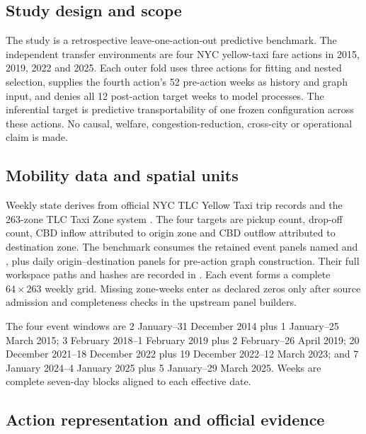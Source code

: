\documentclass{nature}
\begin{document}
\begin{methods}

\subsection{Study design and scope}

The study is a retrospective leave-one-action-out predictive benchmark. The independent transfer environments are four NYC yellow-taxi fare actions in 2015, 2019, 2022 and 2025. Each outer fold uses three actions for fitting and nested selection, supplies the fourth action's 52 pre-action weeks as history and graph input, and denies all 12 post-action target weeks to model processes. The inferential target is predictive transportability of one frozen configuration across these actions. No causal, welfare, congestion-reduction, cross-city or operational claim is made.

\subsection{Mobility data and spatial units}

Weekly state derives from official NYC TLC Yellow Taxi trip records and the 263-zone TLC Taxi Zone system \cite{tlctripdata}. The four targets are pickup count, drop-off count, CBD inflow attributed to origin zone and CBD outflow attributed to destination zone. The benchmark consumes the retained event panels named  and , plus daily origin--destination panels for pre-action graph construction. Their full workspace paths and hashes are recorded in . Each event forms a complete $64\times263$ weekly grid. Missing zone-weeks enter as declared zeros only after source admission and completeness checks in the upstream panel builders.

The four event windows are 2 January--31 December 2014 plus 1 January--25 March 2015; 3 February 2018--1 February 2019 plus 2 February--26 April 2019; 20 December 2021--18 December 2022 plus 19 December 2022--12 March 2023; and 7 January 2024--4 January 2025 plus 5 January--29 March 2025. Weeks are complete seven-day blocks aligned to each effective date.

\subsection{Action representation and official evidence}


\end{methods}
\end{document}
